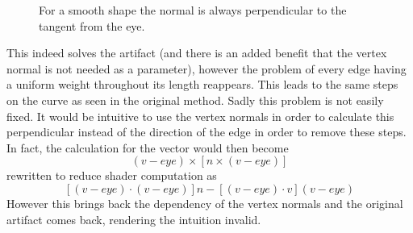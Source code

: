 \documentclass[a4paper, 12pt]{article}
\begin{document}
\begin{figure}[htbp!]
  \centering
  \caption{For a smooth shape the normal is always perpendicular to the tangent from the eye.}
  \label{gaze}
\end{figure}


This indeed solves the artifact (and there is an added benefit that the vertex normal is not needed as a parameter), however the problem of every edge having a uniform weight throughout its length reappears.  This leads to the same steps on the curve as seen in the original method. Sadly this problem is not easily fixed. It would be intuitive to use the vertex normals in order to calculate this perpendicular instead of the direction of the edge in order to remove these steps. In fact, the calculation for the vector would then become
$$(v-eye) \times [n \times (v-eye)]$$
rewritten to reduce shader computation as
$$[(v-eye) \cdot (v-eye)]n - [(v-eye) \cdot v](v-eye)$$
However this brings back the dependency of the vertex normals and the original artifact comes back, rendering the intuition invalid.
\end{document}

